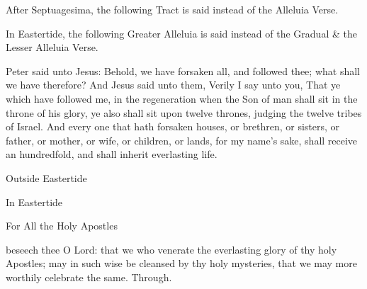 \begin{rubric}
    After Septuagesima, the following Tract is said instead of the Alleluia Verse.
\end{rubric}


\begin{rubric}
    In Eastertide, the following Greater Alleluia is said instead of the Gradual \& the Lesser Alleluia Verse.
\end{rubric}


 Peter said unto Jesus: Behold, we have forsaken all, and followed thee; what shall we have therefore? And Jesus said unto them, Verily I say unto you, That ye which have followed me, in the regeneration when the Son of man shall sit in the throne of his glory, ye also shall sit upon twelve thrones, judging the twelve tribes of Israel. And every one that hath forsaken houses, or brethren, or sisters, or father, or mother, or wife, or children, or lands, for my name's sake, shall receive an hundredfold, and shall inherit everlasting life.

\begin{inhead}
	Outside Eastertide
\end{inhead}

\begin{inhead}
	In Eastertide
\end{inhead}

\secret
\begin{inhead}
	For All the Holy Apostles
\end{inhead}
 beseech thee O Lord: that we who venerate the everlasting glory of thy holy Apostles; may in such wise be cleansed by thy holy mysteries, that we may more worthily celebrate the same. Through.

